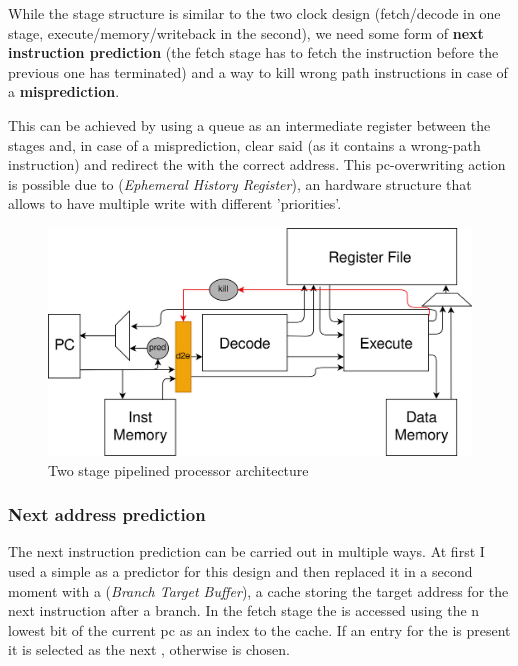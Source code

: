 \documentclass[12pt,oneside,a4paper]{article}
\begin{document}
While the stage structure is similar to the two clock design (fetch/decode in one stage, execute/memory/writeback in the second), we need some form of \textbf{next instruction prediction} (the fetch stage has to fetch the instruction before the previous one has terminated) and a way to kill wrong path instructions in case of a \textbf{misprediction}.

This can be achieved by using a  {\selectfont{FIFO}} queue as an intermediate register between the stages and, in case of a misprediction, clear said  {\selectfont{FIFO}} (as it contains a wrong-path instruction) and redirect the {\selectfont{pc}} with the correct address. This pc-overwriting action is possible due to  {\selectfont{EHR}} (\textit{Ephemeral History Register}), an hardware structure that allows to have multiple write with different 'priorities'.

\begin{figure}[h]
	\centering
	\includegraphics[scale=0.9]{twoStage.png}
	\caption{Two stage pipelined processor architecture}
	\label{twostage}
\end{figure}
\subsubsection{Next address prediction}
The next instruction prediction can be carried out in multiple ways. At first I used a simple {\selectfont{pc+4}} as a predictor for this design and then replaced it in a second moment with a {\selectfont{BTB}} (\textit{Branch Target Buffer}), a cache storing the target address for the next instruction after a branch. In the fetch stage the  {\selectfont{BTB}} is accessed using the n lowest bit of the current pc as an index to the cache. If an entry for the  {\selectfont{pc}} is present it is selected as the next  {\selectfont{pc}}, otherwise {\selectfont{pc+4}} is chosen.
\end{document}
